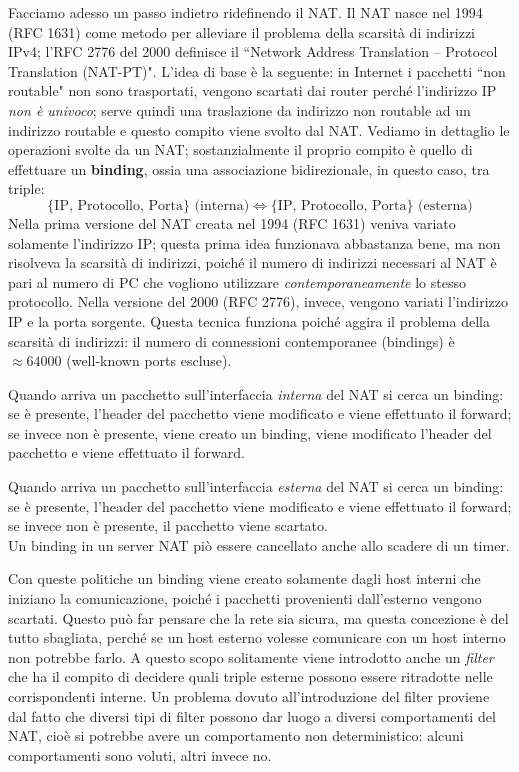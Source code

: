 Facciamo adesso un passo indietro ridefinendo il NAT. Il NAT nasce nel 1994 (RFC 1631) come metodo per alleviare il problema della scarsità di indirizzi IPv4; l'RFC 2776 del 2000 definisce il \textquotedblleft Network Address Translation -- Protocol Translation (NAT-PT)". L'idea di base è la seguente: in Internet i pacchetti \textquotedblleft non routable" non sono trasportati, vengono scartati dai router perché l'indirizzo IP \textit{non è univoco}; serve quindi una traslazione da indirizzo non routable ad un indirizzo routable e questo compito viene svolto dal NAT. Vediamo in dettaglio le operazioni svolte da un NAT; sostanzialmente il proprio compito è quello di effettuare un \textbf{binding}, ossia una associazione bidirezionale, in questo caso, tra triple:
$$\{\text{IP, Protocollo, Porta}\}\text{ (interna)} \Longleftrightarrow \{\text{IP, Protocollo, Porta}\}\text{ (esterna)}$$
Nella prima versione del NAT creata nel 1994 (RFC 1631) veniva variato solamente l'indirizzo IP; questa prima idea funzionava abbastanza bene, ma non risolveva la scarsità di indirizzi, poiché il numero di indirizzi necessari al NAT è pari al numero di PC che vogliono utilizzare \textit{contemporaneamente} lo stesso protocollo. Nella versione del 2000 (RFC 2776), invece, vengono variati l'indirizzo IP e la porta sorgente. Questa tecnica funziona poiché aggira il problema della scarsità di indirizzi: il numero di connessioni contemporanee (bindings) è $\approx 64000$ (well-known ports escluse).

Quando arriva un pacchetto sull'interfaccia \textit{interna} del NAT si cerca un binding: se è presente, l'header del pacchetto viene modificato e viene effettuato il forward; se invece non è presente, viene creato un binding, viene modificato l'header del pacchetto e viene effettuato il forward.

Quando arriva un pacchetto sull'interfaccia \textit{esterna} del NAT si cerca un binding: se è presente, l'header del pacchetto viene modificato e viene effettuato il forward; se invece non è presente, il pacchetto viene scartato.\\
Un binding in un server NAT piò essere cancellato anche allo scadere di un timer.

Con queste politiche un binding viene creato solamente dagli host interni che iniziano la comunicazione, poiché i pacchetti provenienti dall'esterno vengono scartati. Questo può far pensare che la rete sia sicura, ma questa concezione è del tutto sbagliata, perché se un host esterno volesse comunicare con un host interno non potrebbe farlo. A questo scopo solitamente viene introdotto anche un \textit{filter} che ha il compito di decidere quali triple esterne possono essere ritradotte nelle corrispondenti interne. Un problema dovuto all'introduzione del filter proviene dal fatto che diversi tipi di filter possono dar luogo a diversi comportamenti del NAT, cioè si potrebbe avere un comportamento non deterministico: alcuni comportamenti sono voluti, altri invece no.

